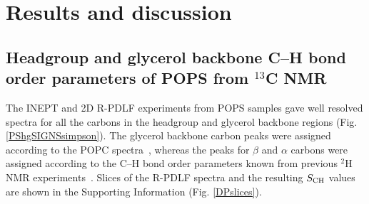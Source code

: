 \documentclass[journal=jpcbfk,manuscript=article]{achemso}
\begin{document}
\section{Results and discussion}

\subsection{Headgroup and glycerol backbone C--H bond order parameters of POPS from $^{13}$C NMR}
The INEPT and 2D R-PDLF experiments from POPS samples gave well resolved spectra for all the
carbons in the headgroup and glycerol backbone regions (Fig. \ref{PShgSIGNSsimpson}).
The glycerol backbone carbon peaks were assigned according to the POPC spectra~\cite{ferreira13}, whereas
the peaks for $\beta$ and $\alpha$ carbons were assigned according to the
C--H bond order parameters known from previous $^2$H\,NMR experiments~\cite{browning80}.
Slices of the R-PDLF spectra and the resulting  $S_{\rm CH}$ values
are shown in the Supporting Information (Fig. \ref{DPslices}). 
\end{document}
